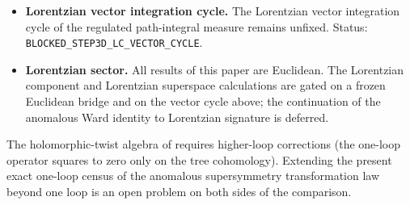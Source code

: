\begin{itemize}[leftmargin=1.6em]
\item \textbf{Lorentzian vector integration cycle.} The Lorentzian vector integration cycle of the regulated
path-integral measure remains unfixed. Status: \texttt{BLOCKED\_STEP3D\_LC\_VECTOR\_CYCLE}.

\item \textbf{Lorentzian sector.} All results of this paper are Euclidean. The Lorentzian component and Lorentzian
superspace calculations are gated on a frozen Euclidean bridge and on the vector cycle above; the continuation of the
anomalous Ward identity to Lorentzian signature is deferred.

\end{itemize}

\begin{remark}\label{rem:concl:higher}
The holomorphic-twist algebra of \cite{BK} requires higher-loop corrections (the one-loop operator squares to zero only
on the tree cohomology). Extending the present exact one-loop census of the anomalous supersymmetry transformation law
beyond one loop is an open problem on both sides of the comparison.
\end{remark}
